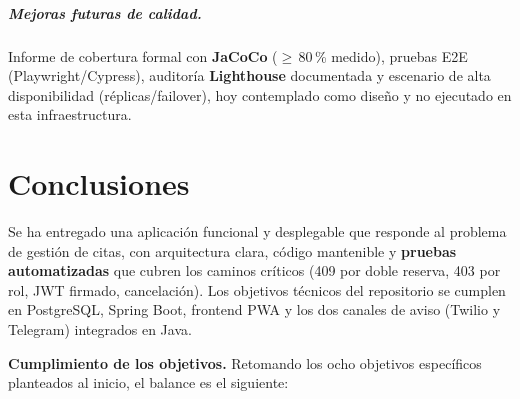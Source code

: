 \documentclass[12pt,a4paper]{report}
\begin{document}
\paragraph{Mejoras futuras de calidad.} Informe de cobertura formal con \textbf{JaCoCo} ($\geq$\,80\,\% medido), pruebas E2E (Playwright/Cypress), auditoría \textbf{Lighthouse} documentada y escenario de alta disponibilidad (réplicas/failover), hoy contemplado como diseño y no ejecutado en esta infraestructura.

\chapter{Conclusiones}

Se ha entregado una aplicación funcional y desplegable que responde al problema de gestión de citas, con arquitectura clara, código mantenible y \textbf{pruebas automatizadas} que cubren los caminos críticos (409 por doble reserva, 403 por rol, JWT firmado, cancelación). Los objetivos técnicos del repositorio se cumplen en PostgreSQL, Spring Boot, frontend PWA y los dos canales de aviso (Twilio y Telegram) integrados en Java.

\textbf{Cumplimiento de los objetivos.} Retomando los ocho objetivos específicos planteados al inicio, el balance es el siguiente:
\end{document}
